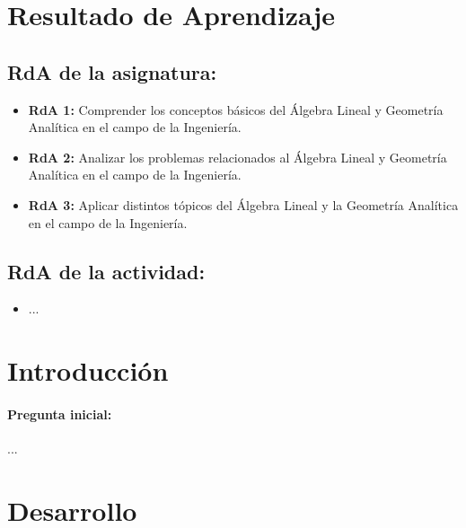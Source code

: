 \documentclass[a4,11pt]{aleph-notas}
\begin{document}
\encabezado

\section*{Resultado de Aprendizaje}

\subsection*{RdA de la asignatura:}
\begin{itemize}[leftmargin=*]
    \item \textbf{RdA 1:} Comprender los conceptos básicos del Álgebra Lineal y Geometría Analítica en el campo de la Ingeniería.
    \item \textbf{RdA 2:} Analizar los problemas relacionados al Álgebra Lineal y Geometría Analítica en el campo de la Ingeniería.
    \item \textbf{RdA 3:} Aplicar distintos tópicos del Álgebra Lineal y la Geometría Analítica en el campo de la Ingeniería.
\end{itemize}

\subsection*{RdA de la actividad:}
\begin{itemize}[leftmargin=*]
    \item ...
\end{itemize}

\section*{Introducción}

\paragraph{Pregunta inicial:} 
...

\section*{Desarrollo}
\end{document}
